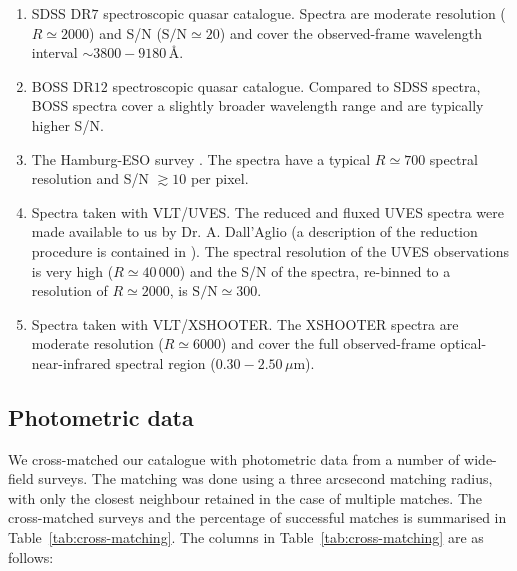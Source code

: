 \begin{enumerate}

 \item SDSS DR$7$ spectroscopic quasar catalogue. Spectra are moderate resolution ($R\simeq2000$) and S/N ($\text{S/N}\simeq20$) and cover the observed-frame wavelength interval $\sim3800-9180$\,\AA.   
 
 \item BOSS DR$12$ \citep{paris17} spectroscopic quasar catalogue. Compared to SDSS spectra, BOSS spectra cover a slightly broader wavelength range and are typically higher S/N. 

 \item The Hamburg-ESO survey \citep{wisotzki00}. The spectra have a typical $R\simeq700$ spectral resolution and S/N $\gtrsim10$ per pixel. 

 \item Spectra taken with VLT/UVES. The reduced and fluxed UVES spectra were made available to us by Dr. A. Dall'Aglio (a description of the reduction procedure is contained in \citealt{dallaglio08}). The spectral resolution of the UVES observations is very high ($R\simeq40\,000$) and the S/N of the spectra, re-binned to a resolution of $R\simeq2000$, is $\text{S/N}\simeq300$. 

 \item Spectra taken with VLT/XSHOOTER. The XSHOOTER spectra are moderate resolution ($R\simeq6000$) and cover the full observed-frame optical-near-infrared spectral region ($0.30-2.50$\,$\mu$m). 

\end{enumerate}

\subsection{Photometric data}

We cross-matched our catalogue with photometric data from a number of wide-field surveys. 
The matching was done using a three arcsecond matching radius, with only the closest neighbour retained in the case of multiple matches. 
The cross-matched surveys and the percentage of successful matches is summarised in Table~\ref{tab:cross-matching}. 
The columns in Table~\ref{tab:cross-matching} are as follows:

